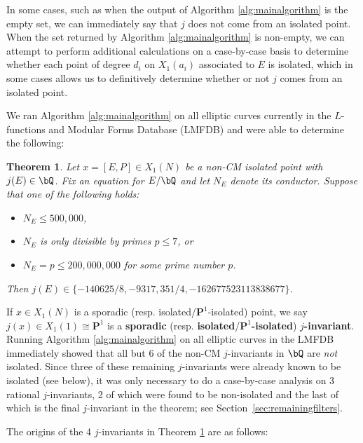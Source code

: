 \documentclass[11pt,reqno]{amsart}
\theoremstyle{plain}
\newtheorem{theorem}{Theorem}%
\theoremstyle{definition}
\newcommand{\Q}{\bQ}
\newcommand{\PP}{\mathbf P}
\begin{document}
In some cases, such as when the output of Algorithm \ref{alg:mainalgorithm} is the empty set, we can immediately say that $j$ does not come from an isolated point. When the set returned by Algorithm \ref{alg:mainalgorithm} is non-empty, we can attempt to perform additional calculations on a case-by-case basis to determine whether each point of degree $d_i$ on $X_1(a_i)$ associated to $E$ is isolated, which in some cases allows us to definitively determine whether or not $j$ comes from an isolated point.%

We ran Algorithm \ref{alg:mainalgorithm} on all elliptic curves currently in the $L$-functions and Modular Forms Database (LMFDB) \cite{LMFDB} and were able to determine the following:

\begin{theorem}\label{LMFDBoutputThm}
Let $x=[E,P]\in X_1(N)$ be a non-CM isolated point with $j(E) \in \Q$.
Fix an equation for $E/\Q$ and let $N_E$ denote its conductor.
Suppose that one of the following holds:
\begin{itemize}
    \item $N_E \leq 500{,}000$,
    \item $N_E$ is only divisible by primes $p \leq 7$, or
    \item $N_E=p \leq 200{,}000{,}000$ for some prime number $p$.
\end{itemize}
Then $j(E) \in \{-140625/8,-9317,351/4, -162677523113838677\}$.%
\end{theorem}

If $x \in X_1(N)$ is a sporadic (resp. isolated/$\PP^1$-isolated) point, we say $j(x) \in X_1(1) \cong \mathbf{P}^1$ is a \textbf{sporadic} (resp. \textbf{isolated}/\textbf{$\PP^1$-isolated}) \textbf{$j$-invariant}. Running Algorithm \ref{alg:mainalgorithm} on all elliptic curves in the LMFDB immediately showed that all but 6 of the non-CM $j$-invariants in $\Q$ are \emph{not} isolated. Since three of these remaining $j$-invariants were already known to be isolated (see below), it was only necessary to do a case-by-case analysis on 3 rational $j$-invariants, 2 of which were found to be non-isolated and the last of which is the final $j$-invariant in the theorem; see Section~\ref{sec:remainingfilters}.

The origins of the 4 $j$-invariants in Theorem \ref{LMFDBoutputThm} are as follows:
\end{document}

